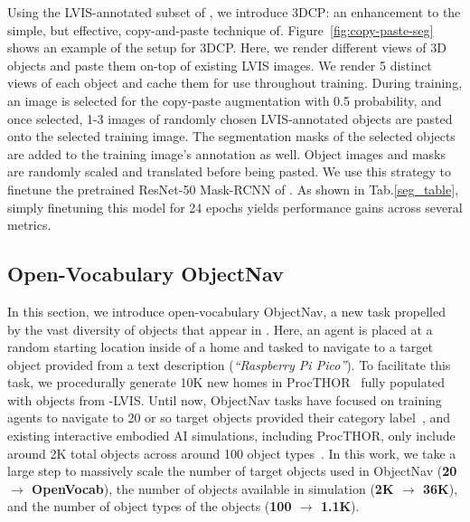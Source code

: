 Using the LVIS-annotated subset of \data, we introduce 3DCP: an enhancement to the simple, but effective, copy-and-paste technique of\cite{ghiasi2021simple}. Figure~\ref{fig:copy-paste-seg} shows an example of the setup for 3DCP. Here, we render different views of 3D objects and paste them on-top of existing LVIS images. We render 5 distinct views of each object and cache them for use throughout training. During training, an image is selected for the copy-paste augmentation with 0.5 probability, and once selected, 1-3 images of randomly chosen LVIS-annotated \data objects are pasted onto the selected training image. The segmentation masks of the selected objects are added to the training image's annotation as well. Object images and masks are randomly scaled and translated before being pasted. We use this strategy to finetune the pretrained ResNet-50 Mask-RCNN \cite{he2017mask,he2016deep} of \cite{alexandridis2022long}. As shown in Tab.\ref{seg_table}, simply finetuning this model for 24 epochs yields performance gains across several metrics.

\vspace{-0.05in}

\subsection{Open-Vocabulary ObjectNav}

\vspace{-0.05in}

In this section, we introduce open-vocabulary ObjectNav, a new task propelled by the vast diversity of objects that appear in \data. Here, an agent is placed at a random starting location inside of a home and tasked to navigate to a target object provided from a text description (\eg \emph{``Raspberry Pi Pico''}). To facilitate this task, we procedurally generate 10K new homes in ProcTHOR~\cite{deitke2022procthor} fully populated with objects from \data-LVIS. Until now, ObjectNav tasks have focused on training agents to navigate to 20 or so target objects provided their category label~\cite{deitke2022retrospectives,ramrakhya2022habitat,deitke2022procthor}, and existing interactive embodied AI simulations, including ProcTHOR, only include around 2K total objects across around 100 object types~\cite{li2021igibson,deitke2022procthor,szot2021habitat}. In this work, we take a large step to massively scale the number of target objects used in ObjectNav (\textbf{20 $\to$ OpenVocab}), the number of objects available in simulation (\textbf{2K $\to$ 36K}), and the number of object types of the objects (\textbf{100 $\to$ 1.1K}).

